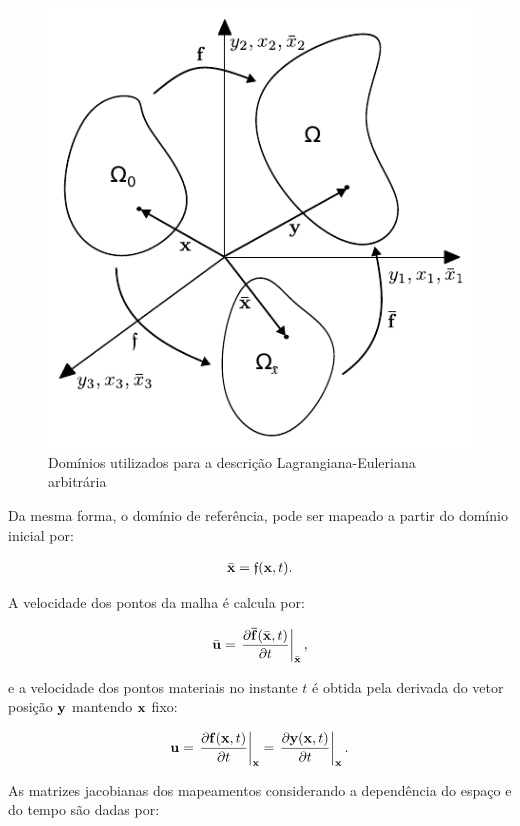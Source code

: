 \documentclass[tese_patricia]{subfiles}%
\begin{document}
\begin{figure}[htb!]
	\centering
	\includegraphics[scale=1.0]{Imagens/Cap2/dominioALE.pdf}	
	\caption{Domínios utilizados para a descrição Lagrangiana-Euleriana arbitrária}
	\label{fig:dominioAle}
\end{figure}

Da mesma forma, o domínio de referência, pode ser mapeado a partir do domínio inicial por:

\begin{align}
	\bar{\mathbf{x}} = \mathfrak{f}(\mathbf{x},t).
\end{align}

A velocidade dos pontos da malha é calcula por:

\begin{align}
	\bar{\mathbf{u}} = \left. \frac{\partial \mathbf{\bar{f}}(\bar{\mathbf{x}},t)}{\partial t} \right|_{\bar{\mathbf{x}}},
\end{align}

\noindent e a velocidade dos pontos materiais no instante $t$ é obtida pela derivada do vetor posição $\mathbf{y}$ mantendo $\mathbf{x}$ fixo:

\begin{align}
	\mathbf{u} = \left. \frac{\partial \mathbf{f}(\mathbf{x},t)}{\partial t} \right|_{\mathbf{x}} = \left. \frac{\partial \mathbf{y}(\mathbf{x},t)}{\partial t} \right|_{\mathbf{x}}.
\end{align}


As matrizes jacobianas dos mapeamentos considerando a dependência do espaço e do tempo são dadas por:
\end{document}
